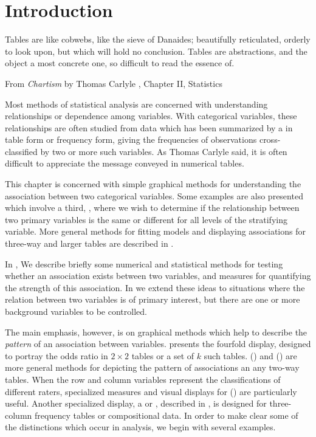 \documentclass[11pt]{book}
\begin{document}
\section{Introduction}\label{sec:twoway-intro}
\epigraph{Tables are like cobwebs, like the
sieve of Danaides; beautifully reticulated, orderly to look upon, but
which will hold no conclusion. Tables are abstractions, and the object a most
concrete one, so difficult to read the essence of.}{From \emph{Chartism} by Thomas Carlyle \citeyearpar{Carlyle:1840}, Chapter II, Statistics}

Most methods of statistical analysis are concerned with understanding
relationships or dependence among variables.
With categorical variables, these relationships are often
studied from data which has been
summarized by a 
in table form or frequency form,
giving the frequencies of observations cross-classified
by two or more such variables. As Thomas Carlyle said, it is often difficult
to appreciate the message conveyed in numerical tables.

This chapter is concerned with simple graphical methods for understanding the association
between two categorical variables.
Some examples are also presented which involve a third, ,
where we wish to determine if the relationship between two primary
variables is the same or different for all levels of the
stratifying variable.
More general methods for fitting models and displaying associations for three-way
and larger tables are described in .

In , We describe briefly some numerical 
and statistical
methods for testing whether an association
exists between two variables,  and measures
for quantifying the strength
of this association.
In  we extend these ideas to situations where
the relation between two variables is of primary interest, but there
are one or more background variables to be controlled.

The main emphasis, however, is on graphical methods which help
to describe the \emph{pattern} of an association between variables.
 presents the fourfold display,
designed to portray the odds ratio in $2 \times 2$ tables or a set
of $k$ such tables.
() and 
() are more general methods for depicting
the pattern of associations an any two-way tables.
When the row and column variables represent the classifications
of different raters, specialized measures and visual displays
for  () are particularly
useful.
Another specialized display, a  or ,
described in ,
is designed
for three-column frequency tables or compositional data.
In order to make clear some of the distinctions which occur in
\ctab analysis, we begin with several examples.
\end{document}
